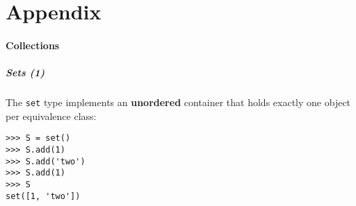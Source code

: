 \documentclass[english,serif,mathserif,xcolor=pdftex,dvipsnames,table]{beamer}
\begin{document}











\part{Appendix}

\subsection{Collections}


\begin{frame}[fragile]
  \frametitle{Sets (1)} The \texttt{set} type implements an
  \textbf{unordered} container that holds exactly one object per
  equivalence class:
\begin{lstlisting}
>>> S = set()
>>> S.add(1)
>>> S.add('two')
>>> S.add(1)
>>> S
set([1, 'two'])
\end{lstlisting}

\end{frame}
\end{document}
